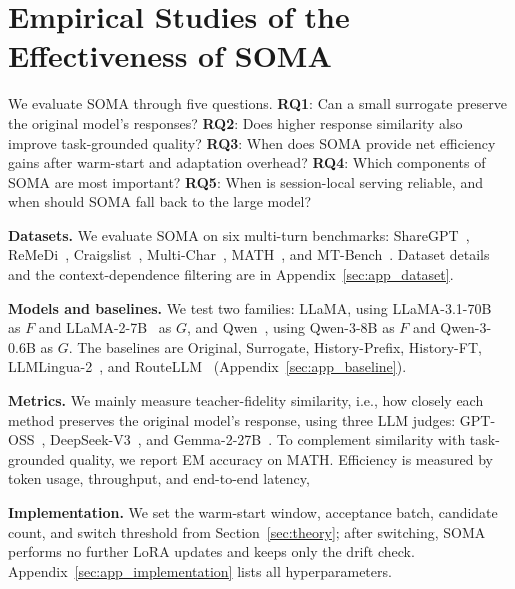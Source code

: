 \section{Empirical Studies of the Effectiveness of SOMA}\label{sec:exp}

We evaluate SOMA through five questions. \textbf{RQ1}: Can a small surrogate preserve the original model's responses? \textbf{RQ2}: Does higher response similarity also improve task-grounded quality? \textbf{RQ3}: When does SOMA provide net efficiency gains after warm-start and adaptation overhead? \textbf{RQ4}: Which components of SOMA are most important? \textbf{RQ5}: When is session-local serving reliable, and when should SOMA fall back to the large model?

\textbf{Datasets.} We evaluate SOMA on six multi-turn benchmarks: ShareGPT~\citep{sharegpt}, ReMeDi~\citep{yan2022remedi}, Craigslist~\citep{he2018decoupling}, Multi-Char~\citep{agentlans_multi-character_dialogue_2024}, MATH~\citep{hendrycks2021measuring}, and MT-Bench~\citep{zheng2023judging}. Dataset details and the context-dependence filtering are in Appendix~\ref{sec:app_dataset}.

\textbf{Models and baselines.} We test two families: LLaMA, using LLaMA-3.1-70B~\citep{grattafiori2024llama3} as \(F\) and LLaMA-2-7B~\citep{touvron2023llama2} as \(G\), and Qwen~\citep{yang2025qwen3}, using Qwen-3-8B as \(F\) and Qwen-3-0.6B as \(G\). The baselines are Original, Surrogate, History-Prefix, History-FT, LLMLingua-2~\citep{pan2024llmlingua}, and RouteLLM~\citep{ong2024routellmlearningroutellms} (Appendix~\ref{sec:app_baseline}).

\textbf{Metrics.} We mainly measure teacher-fidelity similarity, i.e., how closely each method preserves the original model's response, using three LLM judges: GPT-OSS~\citep{openai2025gptoss120bgptoss20bmodel}, DeepSeek-V3~\citep{deepseekai2024deepseekv3}, and Gemma-2-27B~\citep{gemmateam2024gemma2}. To complement similarity with task-grounded quality, we report EM accuracy on MATH. Efficiency is measured by token usage, throughput, and end-to-end  latency, 

\textbf{Implementation.} We set the warm-start window, acceptance batch, candidate count, and switch threshold from Section~\ref{sec:theory}; after switching, SOMA performs no further LoRA updates and keeps only the drift check. Appendix~\ref{sec:app_implementation} lists all hyperparameters.

